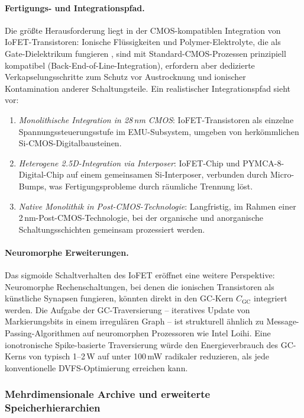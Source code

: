 ﻿\documentclass[a4paper,12pt]{scrreprt}
\theoremstyle{definition}
\begin{document}
	\paragraph{Fertigungs- und Integrationspfad.}
	Die größte Herausforderung liegt in der CMOS-kompatiblen Integration von
	IoFET-Transistoren: Ionische Flüssigkeiten und Polymer-Elektrolyte, die als
	Gate-Dielektrikum fungieren \cite{epp2026iono}, sind mit Standard-CMOS-Prozessen
	prinzipiell kompatibel (Back-End-of-Line-Integration), erfordern aber dedizierte
	Verkapselungsschritte zum Schutz vor Austrocknung und ionischer Kontamination
	anderer Schaltungsteile. Ein realistischer Integrationspfad sieht vor:
	\begin{enumerate}[noitemsep]
		\item \emph{Monolithische Integration in 28\,nm CMOS}: IoFET-Transistoren
		als einzelne Spannungssteuerungsstufe im EMU-Subsystem, umgeben von
		herkömmlichen Si-CMOS-Digitalbausteinen.
		\item \emph{Heterogene 2.5D-Integration via Interposer}: IoFET-Chip und
		PYMCA-8-Digital-Chip auf einem gemeinsamen Si-Interposer, verbunden durch
		Micro-Bumps, was Fertigungsprobleme durch räumliche Trennung löst.
		\item \emph{Native Monolithik in Post-CMOS-Technologie}: Langfristig, im
		Rahmen einer 2\,nm-Post-CMOS-Technologie, bei der organische und
		anorganische Schaltungsschichten gemeinsam prozessiert werden.
	\end{enumerate}

	\paragraph{Neuromorphe Erweiterungen.}
	Das sigmoide Schaltverhalten des IoFET eröffnet eine weitere Perspektive:
	Neuromorphe Rechenschaltungen, bei denen die ionischen Transistoren als
	künstliche Synapsen fungieren, könnten direkt in den GC-Kern $C_{\mathrm{GC}}$
	integriert werden. Die Aufgabe der GC-Traversierung -- iteratives Update von
	Markierungsbits in einem irregulären Graph -- ist strukturell ähnlich zu
	Message-Passing-Algorithmen auf neuromorphen Prozessoren wie Intel Loihi.
	Eine ionotronische Spike-basierte Traversierung würde den Energieverbrauch
	des GC-Kerns von typisch 1--2\,W auf unter 100\,mW radikaler reduzieren,
	als jede konventionelle DVFS-Optimierung erreichen kann.

	\subsubsection{Mehrdimensionale Archive und erweiterte Speicherhierarchien}
\end{document}
